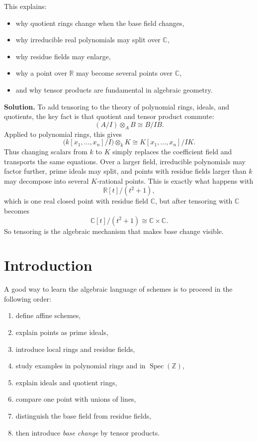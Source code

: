\documentclass[12pt,a4paper]{article}
\theoremstyle{notespace}
\newcommand{\Spec}{\operatorname{Spec}}
\newcommand{\Z}{\mathbb Z}
\theoremstyle{definition}
\begin{document}
This explains:

\begin{itemize}
	\item why quotient rings change when the base field changes,
	\item why irreducible real polynomials may split over \(\mathbb{C}\),
	\item why residue fields may enlarge,
	\item why a point over \(\mathbb{R}\) may become several points over \(\mathbb{C}\),
	\item and why tensor products are fundamental in algebraic geometry.
\end{itemize}

\medskip

\textbf{Solution.}
To add tensoring to the theory of polynomial rings, ideals, and quotients, the key fact is that quotient and tensor product commute:
\[
(A/I)\otimes_A B \cong B/IB.
\]
Applied to polynomial rings, this gives
\[
\bigl(k[x_1,\dots,x_n]/I\bigr)\otimes_k K
\cong
K[x_1,\dots,x_n]/IK.
\]
Thus changing scalars from \(k\) to \(K\) simply replaces the coefficient field and transports the same equations. Over a larger field, irreducible polynomials may factor further, prime ideals may split, and points with residue fields larger than \(k\) may decompose into several \(K\)-rational points. This is exactly what happens with
\[
\mathbb{R}[t]/(t^2+1),
\]
which is one real closed point with residue field \(\mathbb{C}\), but after tensoring with \(\mathbb{C}\) becomes
\[
\mathbb{C}[t]/(t^2+1)\cong \mathbb{C}\times\mathbb{C}.
\]
So tensoring is the algebraic mechanism that makes base change visible.







	
	\section{Introduction}
	
	A good way to learn the algebraic language of schemes is to proceed in the following order:
	
	\begin{enumerate}[leftmargin=2em]
		\item define affine schemes,
		\item explain points as prime ideals,
		\item introduce local rings and residue fields,
		\item study examples in polynomial rings and in \(\Spec(\Z)\),
		\item explain ideals and quotient rings,
		\item compare one point with unions of lines,
		\item distinguish the base field from residue fields,
		\item then introduce \emph{base change} by tensor products.
	\end{enumerate}
	
\end{document}

